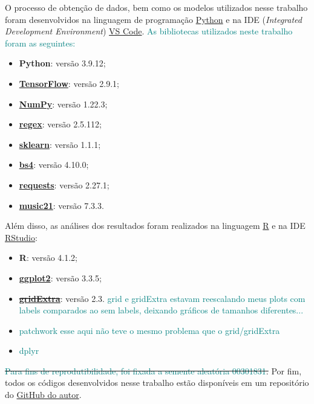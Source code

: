\documentclass{automatextcc}
\newcommand{\nico}[1]{\textcolor{teal}{#1}}
\begin{document}
O processo de obtenção de dados, bem como os modelos utilizados nesse trabalho foram desenvolvidos na linguagem de programação \href{https://python.org/}{Python} e na IDE (\textit{Integrated Development Environment}) \href{https://code.visualstudio.com}{VS Code}. \nico{As bibliotecas utilizados neste trabalho foram as seguintes:}
\begin{itemize}
    \item \textbf{Python}: versão 3.9.12;
    \item \href{https://www.tensorflow.org/?hl=pt-br}{\textbf{TensorFlow}}: versão 2.9.1;
    \item \href{https://numpy.org}{\textbf{NumPy}}: versão 1.22.3;
    \item \href{https://pypi.org/project/regex/}{\textbf{regex}}: versão 2.5.112;
    \item \href{https://scikit-learn.org/stable/}{\textbf{sklearn}}: versão 1.1.1;
    \item \href{https://pypi.org/project/beautifulsoup4/}{\textbf{bs4}}: versão 4.10.0;
    \item \href{https://pypi.org/project/requests/}{\textbf{requests}}: versão 2.27.1;
    \item \href{https://web.mit.edu/music21/}{\textbf{music21}}: versão 7.3.3.
\end{itemize}
Além disso, as análises dos resultados foram realizados na linguagem \href{https://cran.r-project.org}{R} e na IDE \href{https://www.rstudio.com}{RStudio}:
\begin{itemize}
    \item \textbf{R}: versão 4.1.2;
    \item \href{https://ggplot2.tidyverse.org}{\textbf{ggplot2}}: versão 3.3.5;
    \item \href{https://cran.r-project.org/web/packages/gridExtra/index.html}{\textbf{\sout{gridExtra}}}: versão 2.3. \nico{grid e gridExtra estavam reescalando meus plots com labels comparados ao sem labels, deixando gráficos de tamanhos diferentes...}
    \item \nico{patchwork} \nico{esse aqui não teve o mesmo problema que o grid/gridExtra}
    \item \nico{dplyr}
\end{itemize}
\sout{\nico{Para fins de reprodutibilidade, foi fixada a semente aleatória 00301831}.} Por fim, todos os códigos desenvolvidos nesse trabalho estão disponíveis em um repositório do \href{https://github.com/nmhahn/TCC_NMH}{GitHub do autor}.
\end{document}
